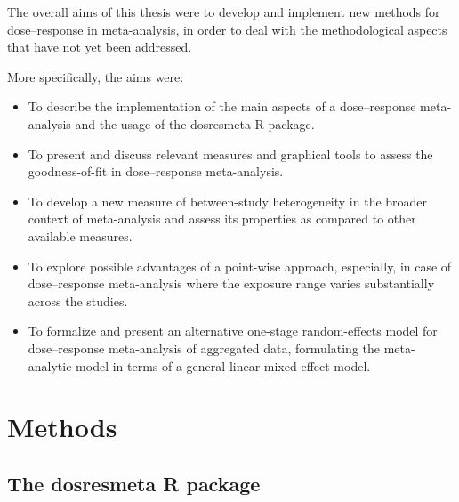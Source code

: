 \documentclass[11pt,a4paper,twoside,openany]{book}\usepackage{knitr}
\newcommand{\pkg}[1]{{\fontseries{b}\selectfont #1}}
\begin{document}
{The overall aims of this thesis were to develop and implement new methods for dose--response in meta-analysis, in order to deal with the methodological aspects that have not yet been addressed.

\bigskip

More specifically, the aims were:

\begin{itemize}
\item To describe the implementation of the main aspects of a dose--response meta-analysis and the usage of the \pkg{dosresmeta} \textsf{R} package.

\item To present and discuss relevant measures and graphical tools to assess the goodness-of-fit in dose--response meta-analysis.

\item To develop a new measure of between-study heterogeneity in the broader context of meta-analysis and assess its properties as compared to other available measures. 

\item To explore possible advantages of a point-wise approach, especially, in case of dose--response meta-analysis where the exposure range varies substantially across the studies.

\item To formalize and present an alternative one-stage random-effects model for dose--response meta-analysis of aggregated data, formulating the meta-analytic model in terms of a general linear mixed-effect model. 

\end{itemize}



%

\chapter{Methods}

\section{The \pkg{dosresmeta} \textsf{R} package}

}
\end{document}
